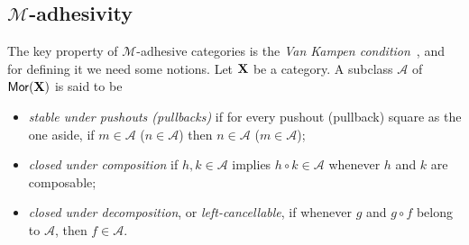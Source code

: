 \documentclass[3p]{elsarticle}
\def\X{\textbf {\textup{X}}}
\newcommand{\mor}{\mathsf{Mor}}
\theoremstyle{remark}
\theoremstyle{definition}
\begin{document}
\subsection{$\mathcal{M}$-adhesivity}\label{subsec:ade}
The key property of $\mathcal{M}$-adhesive categories is the \emph{Van Kampen condition}~\cite{brown1997van,johnstone2007quasitoposes,lack2005adhesive},
%
and for defining it we need some notions.
Let  $\X$ be a category. A subclass $\mathcal{A}$ of $\mor(\X)$ is said to be

\noindent
\begin{minipage}[l]{.85\linewidth}
\begin{itemize}
	\item		\emph{stable under pushouts (pullbacks)} if for every pushout (pullback) square as the one aside, if $m \in \mathcal{A}$ ($n\in \mathcal{A}$) then $n \in \mathcal{A}$ ($m \in \mathcal{A}$);
	\item \emph{closed under composition} if $h, k\in \mathcal{A}$ implies $h\circ k\in \mathcal{A}$ whenever $h$ and $k$ are composable;
	\item \emph{closed under decomposition}, or \emph{left-cancellable}, if whenever $g$ and $g\circ f$ belong to $\mathcal{A}$, then $f\in \mathcal{A}$.
	\end{itemize}
\end{minipage}\hfill 
\begin{minipage}[r]{.13\linewidth}
\end{minipage}
\end{document}
